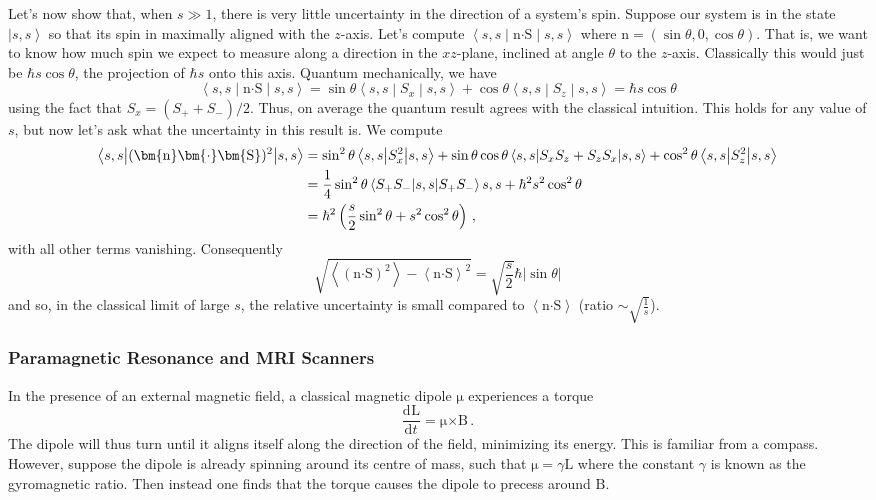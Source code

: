 \documentclass{article}
\theoremstyle{plain}\theoremheaderfont{\normalfont\itshape}\theorembodyfont{\rmfamily}\theoremseparator{.}\newtheorem*{rem}{Remark}\newtheorem*{ex}{Example}\newtheorem*{proof}{Proof}\newtheorem*{altp}{Alternative proof}
\theoremstyle{plain}\theoremheaderfont{\normalfont\bfseries}\theorembodyfont{\rmfamily}\theoremseparator{.}\newtheorem{thm}{Theorem}[section]\newtheorem{lem}[thm]{Lemma}\newtheorem{prop}[thm]{Proposition}\newtheorem*{cor}{Corollary}\newtheorem{defn}[thm]{Definition}\newtheorem{clm}[thm]{Claim}\newtheorem{clminproof}{Claim}
\theoremstyle{break}\theoremheaderfont{\normalfont\itshape}\theorembodyfont{\rmfamily}\theoremseparator{.\medskip}\newtheorem*{proofskip}{Proof}\newtheorem*{exs}{Examples}\newtheorem*{rems}{Remarks}
\theoremstyle{break}\theoremheaderfont{\normalfont\bfseries}\theorembodyfont{\rmfamily}\theoremseparator{.\medskip}\newtheorem{lemskip}[thm]{Lemma}\newtheorem{defnskip}[thm]{Definition}\newtheorem{propskip}[thm]{Proposition}\newtheorem{thmskip}[thm]{Theorem}
\numberwithin{equation}{section}
\newcommand{\dv}[3][]{\frac{\mathrm{d}^{#1} #2}{{\mathrm{d} #3}^{#1}}}
\newcommand{\ket}[1]{\left| #1 \right\rangle}
\newcommand{\eval}[1]{\left\langle #1 \right\rangle}
\newcommand{\expval}[2]{\left\langle #2 \middle| #1 \middle| #2 \right\rangle}
\newcommand{\vb}[1]{\bm{\mathrm{#1}}}
\newcommand{\cross}{\bm{\times}}
\newcommand{\vdot}{\bm{\cdot}}
\newcommand{\abs}[1]{\left| #1 \right|}
\begin{document}
    Let's now show that, when \(s\gg 1\), there is very little uncertainty in the direction of a system's spin. Suppose our system is in the state \(\ket{s,s}\) so that its spin in maximally aligned with the \(z\)-axis. Let's compute \(\expval{\vb{n}\vdot\vb{S}}{s,s}\) where \(\vb{n}=(\sin\theta,0,\cos\theta)\). That is, we want to know how much spin we expect to measure along a direction in the \(xz\)-plane, inclined at angle \(\theta\) to the \(z\)-axis. Classically this would just be \(\hbar s\cos\theta\), the projection of \(\hbar s\) onto this axis. Quantum mechanically, we have
    \begin{equation}
        \expval{\vb{n}\vdot\vb{S}}{s,s}=\sin\theta\expval{S_x}{s,s}+\cos\theta\expval{S_z}{s,s}=\hbar s\cos\theta
    \end{equation}
    using the fact that \(S_x=(S_+ + S_-)/2\). Thus, on average the quantum result agrees with the classical intuition. This holds for any value of \(s\), but now let's ask what the uncertainty in this result is. We compute
    \begin{align}
        \expval{(\vb{n}\vdot\vb{S})^2}{s,s}&=\sin^2\theta\expval{S_x^2}{s,s}+\sin\theta\cos\theta\expval{S_xS_z+S_zS_x}{s,s}+\cos^2\theta\expval{S_z^2}{s,s}\notag\\
        &=\frac{1}{4}\sin^2\theta\expval{s,s}{S_+S_-}{s,s}+\hbar^2 s^2\cos^2\theta\notag\\
        &=\hbar^2\left(\frac{s}{2}\sin^2\theta+s^2\cos^2\theta\right)\,,
    \end{align}
    with all other terms vanishing. Consequently
    \begin{equation}
        \sqrt{\eval{(\vb{n}\vdot\vb{S})^2}-\eval{\vb{n}\vdot\vb{S}}^2}=\sqrt{\frac{s}{2}}\hbar\abs{\sin\theta}
    \end{equation}
    and so, in the classical limit of large \(s\), the relative uncertainty is small compared to \(\eval{\vb{n}\vdot\vb{S}}\) (ratio \(\sim\sqrt{\frac{1}{s}}\)).

    \subsubsection{Paramagnetic Resonance and MRI Scanners}
    In the presence of an external magnetic field, a classical magnetic dipole \(\vb{\mu}\) experiences a torque
    \begin{equation}
        \dv{\vb{L}}{t}=\vb{\mu}\cross\vb{B}\,.
    \end{equation}
    The dipole will thus turn until it aligns itself along the direction of the field, minimizing its energy. This is familiar from a compass. However, suppose the dipole is already spinning around its centre of mass, such that \(\vb{\mu}=\gamma\vb{L}\) where the constant \(\gamma\) is known as the gyromagnetic ratio. Then instead one finds that the torque causes the dipole to precess around \(\vb{B}\).
\end{document}
